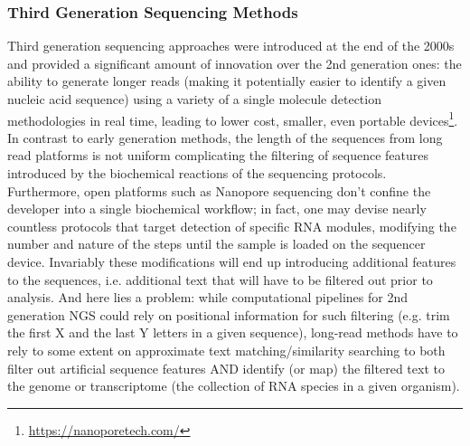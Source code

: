 \documentclass[10pt]{article}
\begin{document}
\subsubsection{Third Generation Sequencing Methods}
Third generation sequencing approaches were introduced at the end of the 2000s \cite{athanasopoulou_third-generation_2021,van_dijk_third_2018} and provided a significant amount of innovation over the 2nd generation ones: the ability to generate longer reads (making it potentially easier to identify a given nucleic acid sequence) using a variety of a single molecule detection methodologies in real time, leading to lower cost, smaller, even portable devices\footnote{\url{https://nanoporetech.com/}}. In  contrast to early generation methods, the length of the sequences from long read platforms is not uniform complicating the  filtering of sequence features introduced by the biochemical reactions of the sequencing protocols. Furthermore, open platforms such as Nanopore sequencing don't confine the developer into a single biochemical workflow; in fact, one may devise nearly countless protocols that target detection of specific RNA modules, modifying the number and nature of the steps until the sample is loaded on the sequencer device. Invariably these modifications will end up introducing additional features to the sequences, i.e. additional text that will have to be filtered out prior to analysis. And here lies a problem: while computational pipelines for 2nd generation NGS could rely on positional information for such filtering (e.g. trim the first X and the last Y letters in a given sequence), long-read methods have to rely to some extent on approximate text matching/similarity searching to both filter out artificial sequence features AND identify (or map) the filtered text to the genome or transcriptome (the collection of RNA species in a given organism).
\end{document}
